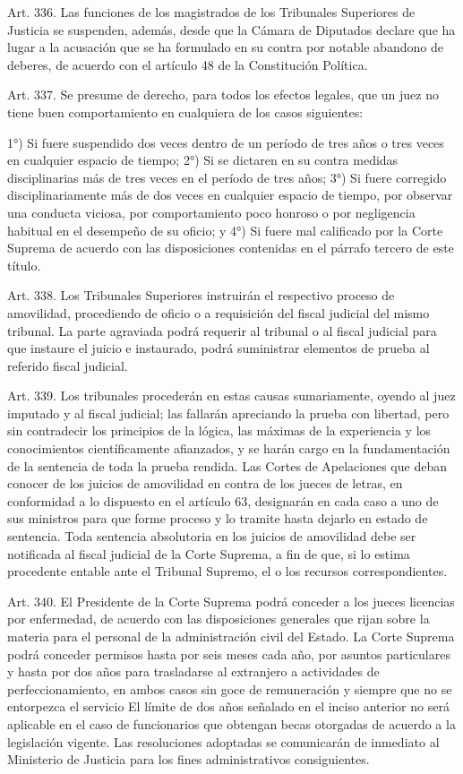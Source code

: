     Art. 336. Las funciones de los magistrados de los Tribunales Superiores de Justicia se suspenden, además, desde que la Cámara de Diputados declare que ha lugar a la acusación que se ha formulado en su contra por notable abandono de deberes, de acuerdo con el artículo 48 de la Constitución Política.



    Art. 337. Se presume de derecho, para todos los efectos legales, que un juez no tiene buen comportamiento en cualquiera de los casos siguientes:

    1°) Si fuere suspendido dos veces dentro de un período de tres años o tres veces en cualquier espacio de tiempo;
    2°) Si se dictaren en su contra medidas disciplinarias más de tres veces en el período de tres años;
    3°) Si fuere corregido disciplinariamente más de dos veces en cualquier espacio de tiempo, por observar una conducta viciosa, por comportamiento poco honroso o por negligencia habitual en el desempeño de su oficio; y
    4°) Si fuere mal calificado por la Corte Suprema de acuerdo con las disposiciones contenidas en el párrafo tercero de este título.

    Art. 338. Los Tribunales Superiores instruirán el respectivo proceso de amovilidad, procediendo de oficio o a requisición del fiscal judicial del mismo tribunal.
    La parte agraviada podrá requerir al tribunal o al fiscal judicial para que instaure el juicio e instaurado, podrá suministrar elementos de prueba al referido fiscal judicial.



    Art. 339. Los tribunales procederán en estas causas sumariamente, oyendo al juez imputado y al fiscal judicial; las fallarán apreciando la prueba con libertad, pero sin contradecir los principios de la lógica, las máximas de la experiencia y los conocimientos científicamente afianzados, y se harán cargo en la fundamentación de la sentencia de toda la prueba rendida.
    Las Cortes de Apelaciones que deban conocer de los juicios de amovilidad en contra de los jueces de letras, en conformidad a lo dispuesto en el artículo 63, designarán en cada caso a uno de sus ministros para que forme proceso y lo tramite hasta dejarlo en estado de sentencia.
    Toda sentencia absolutoria en los juicios de amovilidad debe ser notificada al fiscal judicial de la Corte Suprema, a fin de que, si lo estima procedente entable ante el Tribunal Supremo, el o los recursos correspondientes.


    Art. 340. El Presidente de la Corte Suprema podrá conceder a los jueces licencias por enfermedad, de acuerdo con las disposiciones generales que rijan sobre la materia para el personal de la administración civil del Estado.
    La Corte Suprema podrá conceder permisos hasta por seis meses cada año, por asuntos particulares y hasta por dos años para trasladarse al extranjero a actividades de perfeccionamiento, en ambos casos sin goce de remuneración y siempre que no se entorpezca el servicio
    El límite de dos años señalado en el inciso anterior no será aplicable en el caso de funcionarios que obtengan becas otorgadas de acuerdo a la legislación vigente.
    Las resoluciones adoptadas se comunicarán de inmediato al Ministerio de Justicia para los fines administrativos consiguientes.

